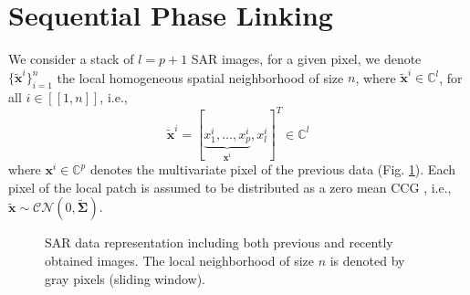 \vspace{-5pt} 
\section{Sequential Phase Linking}
\label{sec:approach}
\vspace{-5pt} 
We consider a stack of $l = p+1$ \acs{SAR} images, for a given pixel, we denote $\{\mathbf{\tilde{x}}^i\}_{i=1}^n$ the local homogeneous spatial neighborhood of size $n$, where $\mathbf{\tilde{x}}^i \in \mathbb{C}^{l}$, for all $i \in [\![1,n]\!]$, i.e., 
\vspace{-7pt} 
\begin{equation}
    \mathbf{\tilde{x}}^i = [\underbrace{x_1^i, \dots, x_p^i}_{\mathbf{x}^i}, x_{l}^i ]^T \in \mathbb{C}^{l}
\end{equation}
where $\mathbf{x}^i \in \mathbb{C}^{p}$ denotes the multivariate pixel of the previous data (Fig. \ref{fig:datacube}). Each pixel of the local patch is assumed to be distributed as a zero mean \ac{CCG} \citep{bamler1998synthetic}, i.e., $\mathbf{\tilde{x}}\sim\mathcal{CN}(0, \mathbf{\tilde{\Sigma}})$. 

\begin{figure}[hbt]
    \centering
\resizebox{\linewidth}{!}{}
\caption{\small \acs{SAR} data representation including both previous and recently obtained images. The local neighborhood of size $n$ is denoted by gray pixels (sliding window). }
\label{fig:datacube}
\end{figure}
\vspace{-5pt} 
